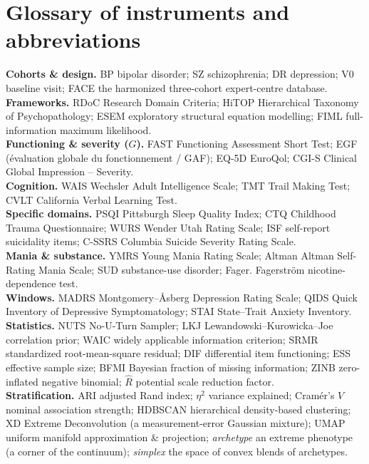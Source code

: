 \section{Glossary of instruments and abbreviations}
\label{app:glossary}
{\small
\textbf{Cohorts \& design.} BP bipolar disorder; SZ schizophrenia; DR depression; V0 baseline visit; FACE the
harmonized three-cohort expert-centre database.\\[3pt]
\textbf{Frameworks.} RDoC Research Domain Criteria; HiTOP Hierarchical Taxonomy of Psychopathology; ESEM
exploratory structural equation modelling; FIML full-information maximum likelihood.\\[3pt]
\textbf{Functioning \& severity ($G$).} FAST Functioning Assessment Short Test; EGF (\'evaluation globale du
fonctionnement / GAF); EQ-5D EuroQol; CGI-S Clinical Global Impression -- Severity.\\[3pt]
\textbf{Cognition.} WAIS Wechsler Adult Intelligence Scale; TMT Trail Making Test; CVLT California Verbal
Learning Test.\\[3pt]
\textbf{Specific domains.} PSQI Pittsburgh Sleep Quality Index; CTQ Childhood Trauma Questionnaire; WURS
Wender Utah Rating Scale; ISF self-report suicidality items; C-SSRS Columbia Suicide Severity Rating Scale.\\[3pt]
\textbf{Mania \& substance.} YMRS Young Mania Rating Scale; Altman Altman Self-Rating Mania Scale; SUD
substance-use disorder; Fager. Fagerstr\"om nicotine-dependence test.\\[3pt]
\textbf{Windows.} MADRS Montgomery--\AA sberg Depression Rating Scale; QIDS Quick Inventory of Depressive
Symptomatology; STAI State--Trait Anxiety Inventory.\\[3pt]
\textbf{Statistics.} NUTS No-U-Turn Sampler; LKJ Lewandowski--Kurowicka--Joe correlation prior; WAIC widely
applicable information criterion; SRMR standardized root-mean-square residual; DIF differential item
functioning; ESS effective sample size; BFMI Bayesian fraction of missing information; ZINB zero-inflated
negative binomial; $\widehat{R}$ potential scale reduction factor.\\[3pt]
\textbf{Stratification.} ARI adjusted Rand index; $\eta^2$ variance explained; Cram\'er's $V$ nominal
association strength; HDBSCAN hierarchical density-based clustering; XD Extreme Deconvolution (a
measurement-error Gaussian mixture); UMAP uniform manifold approximation \& projection; \emph{archetype} an
extreme phenotype (a corner of the continuum); \emph{simplex} the space of convex blends of archetypes.}

